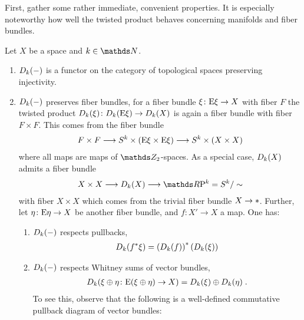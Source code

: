 First, gather some rather immediate, convenient properties. It is
especially noteworthy how well the twisted product behaves concerning
manifolds and fiber bundles.
\begin{Rem}\label{rem:twistedprodproperties}
  Let $X$ be a space and $k\in\Nat$.
  \begin{enumerate}
  \item $D_{k}({-})$ is a functor on the category of
    topological spaces preserving injectivity.
  \item\label{item:twistedprodfiberbdl}
    $D_{k}({-})$ preserves fiber bundles,
    \idest for a fiber bundle $\xi\colon\mathrm{E}\xi\to X$ with fiber $F$
    the twisted product $D_{k}({\xi})\colon
    D_{k}({\mathrm{E}\xi})\to D_{k}({X})$
    is again a fiber bundle with fiber $F\times F$.
    This comes from the fiber bundle
    \begin{gather*}
      F\times F
      \longrightarrow S^{k}\times(\mathrm{E}\xi\times \mathrm{E}\xi)
      \longrightarrow S^{k}\times(X\times X)
    \end{gather*}
    where all maps are maps of $\Zmod2$-spaces.
    As a special case, $D_{k}({X})$ admits a fiber bundle
    \begin{gather}\label{eq:twistedprodrpnfiberbdl}
      X\times X
      \longto \Twistedprod{k}{X}
      \longto \RP k = \Sphere k/\sim
    \end{gather}
    with fiber $X\times X$ which comes from the trivial fiber bundle
    $X\to*$.
    Further, let $\eta\colon\mathrm{E}\eta\to X$ be
    another fiber bundle, and $f\colon X'\to X$ a map.
    One has:
    \begin{enumerate}
    \item\label{item:twistedprod:preservespb}
      $D_{k}({-})$ respects pullbacks, \idest
      \begin{gather*}
        D_{k}({{f}^* \xi})
        = {\left(D_{k}({f})\right)}^*
        \left(D_{k}({\xi})\right)
      \end{gather*}
    \item $D_{k}({-})$ respects Whitney sums of vector
      bundles, \idest 
      \begin{gather*}
        D_{k}({\xi\oplus\eta\colon \mathrm{E}(\xi\oplus\eta)\to X})
        = D_{k}({\xi})\oplus D_{k}({\eta})
        \;.
      \end{gather*}
      To see this, observe that the following is a well-defined
      commutative pullback diagram of vector bundles:

\end{enumerate}
\end{enumerate}
\end{Rem}
